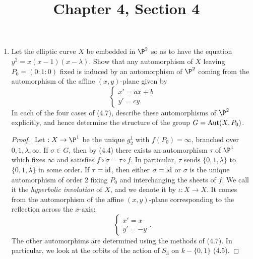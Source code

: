 \documentclass[a4paper]{article}
\title{Chapter 4, Section 4}
\begin{document}
\maketitle

\begin{enumerate} [label=\textbf{\arabic*.}, leftmargin=0em]

    \item[\textbf{3.}] Let the elliptic curve $X$ be embedded in $\P^2$ so as to have the equation $y^2 = x(x - 1)(x - \lambda)$.
          Show that any automorphism of $X$ leaving $P_0 = (0:1:0)$ fixed is induced by an automorphism of $\P^2$ coming from the automorphism of the affine $(x, y)$-plane given by
          \begin{equation*}
              \begin{cases*}
                  x' = ax + b \\
                  y' = cy.
              \end{cases*}
          \end{equation*}
          In each of the four cases of (4.7), describe these automorphisms of $\P^2$ explicitly, and hence determine the structure of the group $G = \operatorname{Aut}(X, P_0)$.

          \begin{proof} $ $ \vspace{0pt}
              Let $ : X \to \P^1$ be the unique $g_2^1$ with $f(P_0) = \infty$, branched over $0, 1, \lambda, \infty$.
              If $\sigma \in G$, then by (4.4) there exists an automorphism $\tau$ of $\P^1$ which fixes $\infty$ and satisfies $f \circ \sigma = \tau \circ f$.
              In particular, $\tau$ sends $\{0, 1, \lambda\}$ to $\{0, 1, \lambda\}$ in some order.
              If $\tau = \operatorname{id}$, then either $\sigma = \operatorname{id}$ or $\sigma$ is the unique automorphism of order 2 fixing $P_0$ and interchanging the sheets of $f$.
              We call it the \textit{hyperbolic involution} of $X$, and we denote it by $\iota : X \to X$.
              It comes from the automorphism of the affine $(x, y)$-plane corresponding to the reflection across the $x$-axis:
              \begin{equation*}
                  \begin{cases*}
                      x' = x \\
                      y' = -y
                  \end{cases*}.
              \end{equation*}
              The other automorphims are determined using the methods of (4.7).
              In particular, we look at the orbits of the action of $S_3$ on $k - \{0, 1\}$ (4.5).


\end{proof}
\end{enumerate}
\end{document}
